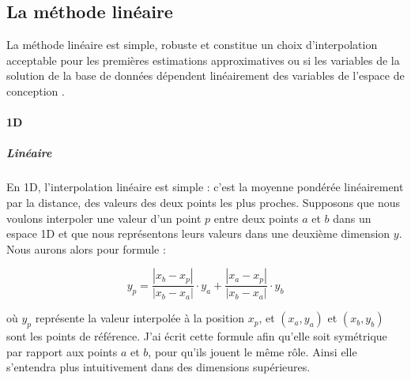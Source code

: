 \subsection{La méthode linéaire}
La méthode linéaire est simple, robuste et constitue un choix d'interpolation acceptable pour les premières estimations approximatives ou si les variables de la solution de la base de données dépendent linéairement des variables de l'espace de conception \cite{palmer2009}.


\paragraph{1D}
\vspace{-0.5cm}
\subparagraph{Linéaire}
En 1D, l'interpolation linéaire est simple \cite{fluidssengineer, palmer2009}: c'est la moyenne pondérée linéairement par la distance, des valeurs des deux points les plus proches.
Supposons que nous voulons interpoler une valeur d'un point \( p \) entre deux points \( a \) et \( b \) dans un espace 1D
et que nous représentons leurs valeurs dans une deuxième dimension \( y \).
Nous aurons alors pour formule :

\begin{equation}
y_p = \frac{|x_b - x_p|}{|x_b - x_a|} \cdot y_a + \frac{|x_a - x_p|}{|x_b - x_a|} \cdot y_b
\end{equation}

où \( y_p \) représente la valeur interpolée à la position \( x_p \), et \((x_a, y_a)\) et \((x_b, y_b)\) sont les points de référence. J'ai écrit cette formule afin qu'elle soit symétrique par rapport aux points \( a \) et \( b \), pour qu'ils jouent le même rôle. Ainsi elle s'entendra plus intuitivement dans des dimensions supérieures.
\vspace{0.5cm}

